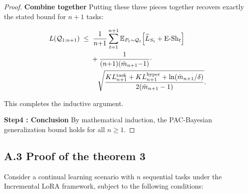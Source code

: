 \documentclass[letterpaper]{article} %
\begin{document}
\begin{proof}
\textbf{Combine together}
Putting these three pieces together recovers exactly the stated bound for \(n+1\) tasks:

\begin{equation}
\begin{aligned}
L(\mathcal Q_{1:n+1}) \;\le\;
&\;\frac{1}{n{+}1} \sum_{t=1}^{n{+}1} 
\mathbb{E}_{P_t \sim \mathcal Q_t} 
\Bigl[\widehat L_{S_t} + \mathrm{E\text{-}Sh}_t\Bigr] \\
&+ \frac{1}{(n{+}1)(\bar m_{n{+}1} {-} 1)} \cdot \\
&\quad \sqrt{
\frac{KL^{\mathrm{task}}_{n+1} + KL^{\mathrm{hyper}}_{n+1} + \ln(\bar m_{n+1}/\delta)}
{2(\bar m_{n+1} - 1)}
}.
\end{aligned}
\end{equation}




This completes the inductive argument.  

\textbf{Step4 : Conclusion} By mathematical induction, the PAC-Bayesian generalization bound holds for all $n \ge 1$.

\end{proof}









\subsection{A.3 Proof of the theorem 3}


Consider a continual learning scenario with $n$ sequential tasks under the Incremental LoRA framework, subject to the following conditions:
\end{document}
